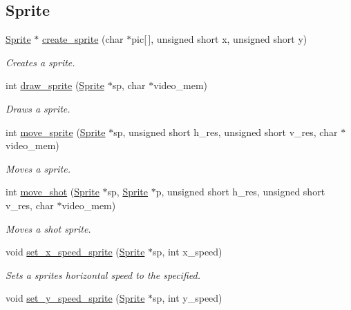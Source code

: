 \subsection*{Sprite}
\begin{DoxyCompactItemize}
\item 
\hyperlink{struct_sprite}{Sprite} $\ast$ \hyperlink{group__sprite_ga585fbaeb1d5f34bb4e1393e7e99697dd}{create\+\_\+sprite} (char $\ast$pic\mbox{[}$\,$\mbox{]}, unsigned short x, unsigned short y)
\begin{DoxyCompactList}\small\item\em Creates a sprite. \end{DoxyCompactList}\item 
int \hyperlink{group__sprite_ga65b342bdee0447b4d253a3fcfc95d78b}{draw\+\_\+sprite} (\hyperlink{struct_sprite}{Sprite} $\ast$sp, char $\ast$video\+\_\+mem)
\begin{DoxyCompactList}\small\item\em Draws a sprite. \end{DoxyCompactList}\item 
int \hyperlink{group__sprite_ga8446db36e642f6bb7e0e566f0fac9637}{move\+\_\+sprite} (\hyperlink{struct_sprite}{Sprite} $\ast$sp, unsigned short h\+\_\+res, unsigned short v\+\_\+res, char $\ast$video\+\_\+mem)
\begin{DoxyCompactList}\small\item\em Moves a sprite. \end{DoxyCompactList}\item 
int \hyperlink{group__sprite_gab9af15d14a3cb2f3f290be7355fbdb77}{move\+\_\+shot} (\hyperlink{struct_sprite}{Sprite} $\ast$sp, \hyperlink{struct_sprite}{Sprite} $\ast$p, unsigned short h\+\_\+res, unsigned short v\+\_\+res, char $\ast$video\+\_\+mem)
\begin{DoxyCompactList}\small\item\em Moves a shot sprite. \end{DoxyCompactList}\item 
void \hyperlink{group__sprite_ga4dd652976ab61cba06875d87e52df12f}{set\+\_\+x\+\_\+speed\+\_\+sprite} (\hyperlink{struct_sprite}{Sprite} $\ast$sp, int x\+\_\+speed)
\begin{DoxyCompactList}\small\item\em Sets a sprite\textquotesingle{}s horizontal speed to the specified. \end{DoxyCompactList}\item 
void \hyperlink{group__sprite_ga4ca599f2889585f0c7a78ec6622d6928}{set\+\_\+y\+\_\+speed\+\_\+sprite} (\hyperlink{struct_sprite}{Sprite} $\ast$sp, int y\+\_\+speed)

\end{DoxyCompactItemize}
